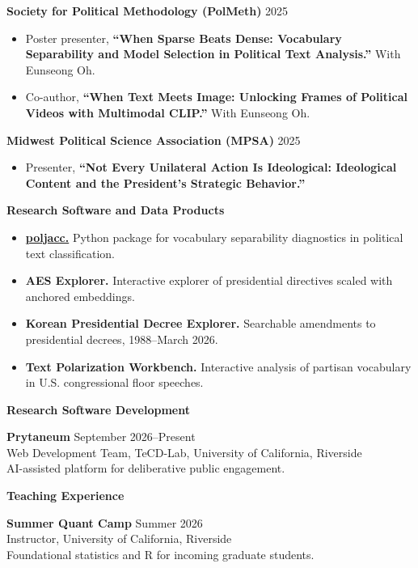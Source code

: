 \documentclass[11pt]{article}
\newcommand{\cvsection}[1]{%
  \par\addvspace{12pt}
  \Needspace{5\baselineskip}
  {\large\sffamily\bfseries\color{cvaccent}#1}\par\nobreak
  \vspace{3pt}{\color{cvrule}\hrule height 0.3pt}\nobreak
  \vspace{8pt}
}
\newcommand{\cvdate}[1]{{\small\color{cvmuted}#1}}
\begin{document}
\par\addvspace{8pt}
\textbf{Society for Political Methodology (PolMeth)} \hfill \cvdate{2025}
\begin{itemize}
    \item Poster presenter, \textbf{``When Sparse Beats Dense: Vocabulary Separability and Model Selection in Political Text Analysis.''} With Eunseong Oh.
    \item Co-author, \textbf{``When Text Meets Image: Unlocking Frames of Political Videos with Multimodal CLIP.''} With Eunseong Oh.
\end{itemize}

\vspace{0.25cm}
\textbf{Midwest Political Science Association (MPSA)} \hfill \cvdate{2025}
\begin{itemize}
    \item Presenter, \textbf{``Not Every Unilateral Action Is Ideological: Ideological Content and the President's Strategic Behavior.''}
\end{itemize}

\cvsection{Research Software and Data Products}

\begin{itemize}[label={}]
    \item \href{https://github.com/YongjaiYu/poljacc}{\textbf{poljacc.}} Python package for vocabulary separability diagnostics in political text classification.
    \item \textbf{AES Explorer.} Interactive explorer of presidential directives scaled with anchored embeddings.
    \item \textbf{Korean Presidential Decree Explorer.} Searchable amendments to presidential decrees, 1988--March 2026.
    \item \textbf{Text Polarization Workbench.} Interactive analysis of partisan vocabulary in U.S. congressional floor speeches.
\end{itemize}

\cvsection{Research Software Development}

\textbf{Prytaneum} \hfill \cvdate{September 2026--Present}\\
Web Development Team, TeCD-Lab, University of California, Riverside\\
AI-assisted platform for deliberative public engagement.

\cvsection{Teaching Experience}

\textbf{Summer Quant Camp} \hfill \cvdate{Summer 2026}\\
Instructor, University of California, Riverside\\
Foundational statistics and R for incoming graduate students.
\end{document}
